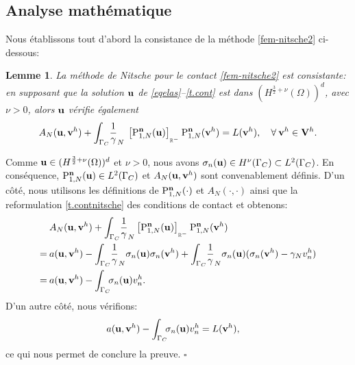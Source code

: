 \documentclass[11pt]{book}
\newtheorem{lemma}[theorem]{Lemme}
\newcommand{\bl}{\begin{lemma}}
\newcommand{\el}{\end{lemma}}
\newcommand{\cqfd}{{$\mbox{}$\hfill$\square$}}
\def\u{{\bf u}}
\def\n{{\bf n}}
\def\vv{{\bf v}}
\def\V{{\bf V}}
\newcommand{\ds}{\displaystyle}
\newcommand{\R}{\mathbb{R}}
\newcommand{\Gc}{\Gamma_{C}}
\newcommand{\dg}{d\Gamma}
\newcommand{\igc}{{\ds\int_{\Gc}\hspace*{-0.7em}}}
\newcommand{\sn}{{\sigma_n}}
\newcommand{\gN}{\gamma_{N}}
\newcommand{\Pgh}{P_{\gamma}}
\newcommand{\Agh}{A_{N}}
\newcommand{\PNgh}{\mathrm{P}^{\n}_{1, N}}
\newcommand{\pn}[1]{\left [ #1 \right ]_{_{\R^-}}}
\begin{document}
\subsection{Analyse mathématique}


Nous établissons tout d'abord la consistance de la méthode \eqref{fem-nitsche2} ci-dessous:

\bl
La méthode de Nitsche pour le contact \eqref{fem-nitsche2} est consistante: en supposant que la solution $\u$ de \eqref{eqelas}--\eqref{t.cont} 
est dans $(H^{\frac32+\nu}(\Omega))^d$, avec $\nu > 0$, alors $\u$ vérifie également
\begin{equation*} %
\Agh (\u,\vv^h)
+ 
\igc \:\:\: \frac1\gN \: \pn{\PNgh (\u)} \PNgh (\vv^h) %
= L(\vv^h),
\quad \forall \: \vv^h \in \V^h.
\end{equation*}
\el

\proof
Comme $\u \in (H^{\frac32+\nu}(\Omega))^d$ et $\nu>0$, nous avons
 $\sn(\u) \in H^\nu (\Gc) \subset L^2(\Gc)$. 
En conséquence, $\PNgh(\u) \in L^2(\Gc)$ et $\Agh(\u,\vv^h)$ sont convenablement définis.
%
%
%
D'un côté, nous utilisons les définitions de $\PNgh(\cdot)$ et
$\Agh(\cdot,\cdot)$ ainsi que la reformulation
\eqref{t.contnitsche} des conditions de contact et obtenons:
\begin{align*}
& \Agh (\u,\vv^h) + \igc \:\:\: \frac1\gN  \pn{ \PNgh (\u) } 
\PNgh (\vv^h)\\ %
=\:& a(\u,\vv^h) - \igc \:\:\: \frac1\gN  \sn(\u) \sn(\vv^h) %
+ \igc \:\:\: \frac1\gN  \sn(\u) ( \sn(\vv^h) - \gN v^h_n )\\ %
=\:& a(\u,\vv^h) 
- \igc \:\: \sn(\u) v^h_n. %
\end{align*}
D'un autre côté,
nous vérifions:
\begin{align*}
& a(\u,\vv^h) 
- \igc \:\: \sn(\u) v^h_n %
=L(\vv^h),
\end{align*}
ce qui nous permet de conclure la preuve.
\cqfd
 
\end{document}
